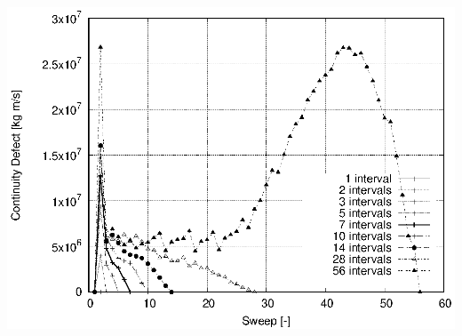 \documentclass[twoside,a4paper,12pt,bibliography=totoc, parskip=half,english]{scrreprt}
\begin{document}
\includegraphics[scale=1]{14_primal_modef_newton.eps}
\end{document}
